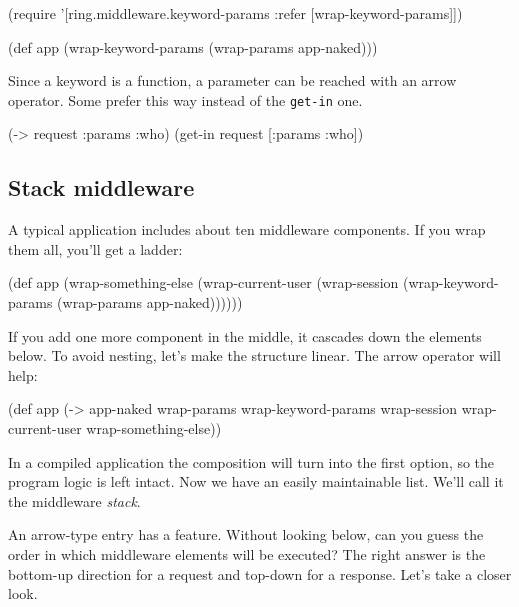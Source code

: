 \begin{clojure}
(require '[ring.middleware.keyword-params
           :refer [wrap-keyword-params]])

(def app (wrap-keyword-params
           (wrap-params app-naked)))
\end{clojure}


Since a keyword is a function, a parameter can be reached with an arrow operator. Some prefer this way instead of the \verb|get-in| one.

\begin{clojure}
(-> request :params :who)
(get-in request [:params :who])
\end{clojure}

\subsection{Stack middleware}

A typical application includes about ten middleware components. If you wrap them all, you'll get a ladder:

\begin{clojure}
(def app
  (wrap-something-else
    (wrap-current-user
      (wrap-session
        (wrap-keyword-params
          (wrap-params app-naked))))))
\end{clojure}


If you add one more component in the middle, it cascades down the elements below. To avoid nesting, let's make the structure linear. The arrow operator will help:


\begin{clojure/lines}
(def app
  (-> app-naked
      wrap-params
      wrap-keyword-params
      wrap-session
      wrap-current-user
      wrap-something-else))
\end{clojure/lines}


In a compiled application the composition will turn into the first option, so the program logic is left intact. Now we have an easily maintainable list. We'll call it
the middleware \emph{stack}.

An arrow-type entry has a feature. Without looking below, can you guess the order in which middleware elements will be executed? The right answer is the bottom-up direction for a request and top-down for a response. Let's take a closer look.

